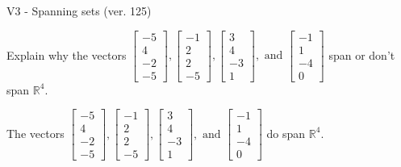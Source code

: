 \begin{exercise}
  \begin{exerciseTitle}V3 - Spanning sets (ver. 125)\end{exerciseTitle}
  \begin{exerciseStatement}
    Explain why the vectors \(\left[\begin{array}{r}
-5 \\
4 \\
-2 \\
-5
\end{array}\right] , \left[\begin{array}{r}
-1 \\
2 \\
2 \\
-5
\end{array}\right] , \left[\begin{array}{r}
3 \\
4 \\
-3 \\
1
\end{array}\right] , \text{ and } \left[\begin{array}{r}
-1 \\
1 \\
-4 \\
0
\end{array}\right]\) span or don't span \(\mathbb{R}^4\). 
	


  \end{exerciseStatement}
  \begin{exerciseAnswer}
   The vectors \(\left[\begin{array}{r}
-5 \\
4 \\
-2 \\
-5
\end{array}\right] , \left[\begin{array}{r}
-1 \\
2 \\
2 \\
-5
\end{array}\right] , \left[\begin{array}{r}
3 \\
4 \\
-3 \\
1
\end{array}\right] , \text{ and } \left[\begin{array}{r}
-1 \\
1 \\
-4 \\
0
\end{array}\right]\) 
  	 do  
	span \(\mathbb{R}^4\).
  


  \end{exerciseAnswer}
\end{exercise}
